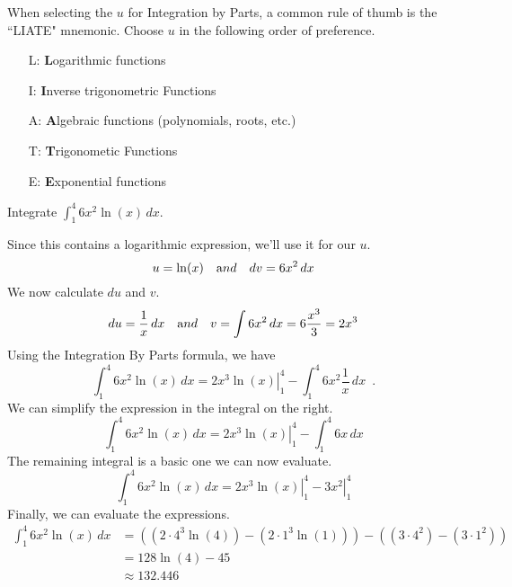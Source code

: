 \begin{note}
When selecting the $u$ for Integration by Parts, a common rule of thumb is the ``LIATE" mnemonic. Choose $u$ in the following order of preference.
\begin{itemize}
  \item[L:] {\bf L}ogarithmic functions
  \item[I:] {\bf I}nverse trigonometric Functions
  \item[A:] {\bf A}lgebraic functions (polynomials, roots, etc.)
  \item[T:] {\bf T}rigonometic Functions
  \item[E:] {\bf E}xponential functions
\end{itemize}

\end{note}
\begin{example}
Integrate $\displaystyle\int_1^4 6x^2\ln(x)\,dx$.

\begin{solution}
Since this contains a logarithmic expression, we'll use it for our $u$.
$$u = \ln(x) \quad {\text and} \quad dv = 6x^2\,dx$$
We now calculate $du$ and $v$.
$$du = \frac{1}{x}\,dx  \quad {\text and} \quad v = \int 6x^2\,dx = 6\frac{x^3}{3} = 2x^3$$
Using the Integration By Parts formula, we have
$$\int_1^4 6x^2\ln(x)\,dx = \left.2x^3\ln(x)\right|^4_1-\int^4_1 6x^2 \frac{1}{x}\,dx \enspace .$$
We can simplify the expression in the integral on the right.
$$\int^4_1 6x^2\ln(x)\,dx = \left.2x^3\ln(x)\right|^4_1 - \int^4_1 6x\,dx$$
The remaining integral is a basic one we can now evaluate.
$$\int^4_1 6x^2\ln(x)\,dx = \left.2x^3\ln(x)\right|^4_1 - \left.3x^2\right|^4_1$$
Finally, we can evaluate the expressions.
\begin{align*}
\int^4_1 6x^2\ln(x)\,dx &= ((2\cdot 4^3\ln(4))-(2\cdot 1^3\ln(1)))-((3\cdot 4^2)-(3\cdot 1^2)) \\
&= 128\ln(4)-45\\
&\approx   132.446
\end{align*}
\end{solution}\end{example}
